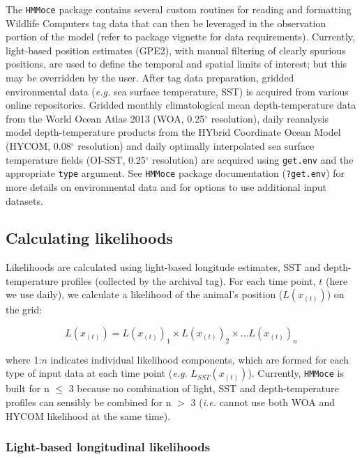 The \texttt{HMMoce} package contains several custom routines for reading
and formatting Wildlife Computers tag data that can then be leveraged in
the observation portion of the model (refer to package vignette for data
requirements). Currently, light-based position estimates (GPE2), with
manual filtering of clearly spurious positions, are used to define the
temporal and spatial limits of interest; but this may be overridden by
the user. After tag data preparation, gridded environmental data
(\emph{e.g.} sea surface temperature, SST) is acquired from various
online repositories. Gridded monthly climatological mean
depth-temperature data from the World Ocean Atlas 2013 (WOA, 0.25$^{\circ}$
resolution), daily reanalysis model depth-temperature products from the
HYbrid Coordinate Ocean Model (HYCOM, 0.08$^{\circ}$ resolution) and daily
optimally interpolated sea surface temperature fields (OI-SST, 0.25$^{\circ}$
resolution) are acquired using \texttt{get.env} and the appropriate
\texttt{type} argument. See \texttt{HMMoce} package documentation
(\texttt{?get.env}) for more details on environmental data and for
options to use additional input datasets.

\subsection{Calculating likelihoods}%

Likelihoods are calculated using light-based longitude estimates, SST
and depth-temperature profiles (collected by the archival tag). For each
time point, $t$ (here we use daily), we calculate a likelihood of the
animal's position ($L(x_{(t)})$) on the grid:

\begin{equation}
L(x_{(t)}) = L(x_{(t)})_1 \times L(x_{(t)})_2 \times ... L(x_{(t)})_n
\label{eq:a1e1}
\end{equation}

where 1:$n$ indicates individual likelihood components, which are
formed for each type of input data at each time point (\textit{e.g.}
$L_{SST}(x_{(t)})$). Currently, \texttt{HMMoce} is built for n
$\leq$ 3 because no combination of light, SST and depth-temperature
profiles can sensibly be combined for n $>$ 3 (\emph{i.e.} cannot use both
WOA and HYCOM likelihood at the same time).

\subsubsection{Light-based longitudinal
likelihoods}%

